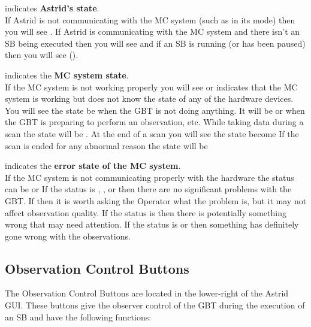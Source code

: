 \begin{description}[leftmargin=*,itemsep=0pt]
\item[Observation State] indicates \textbf{\gls{Astrid}'s state}.\\
If \gls{Astrid} is not communicating with the \gls{MC} system (such as in its
 mode) then you will see .  If \gls{Astrid} is
communicating with the \gls{MC} system and there isn't an \gls{SB} being executed
then you will see  and if an \gls{SB} is running (or has been paused)
then you will see (). 

\item[GBT State] indicates the \textbf{\gls{MC} system state}.\\
If the \gls{MC} system is not working properly you will see 
or   indicates that the \gls{MC} system is working
but does not know the state of any of the hardware devices.  You will see the state
be  when the \gls{GBT} is not doing anything.  It will be 
or  when the \gls{GBT} is preparing to perform an observation, etc.
While taking data during a scan the state will be .  At the end
of a scan you will see the state become   If the scan is ended
for any abnormal reason the state will be 

\item[GBT Status] indicates the \textbf{error state of the \gls{MC} system}.\\
If the \gls{MC} system is not communicating properly with the hardware the status can
be  or   If the status is , ,
or   then there are no significant problems with the \gls{GBT}.
If  then it is worth asking the Operator what the problem is, but
it may not affect observation quality.  If the status is  then there
is potentially something wrong that may need attention. If the status is
 or  then something has definitely gone wrong with the
observations.
\end{description}


\subsection{Observation Control Buttons}

The Observation Control Buttons are located in the lower-right of the \gls{Astrid}
\gls{GUI}. These buttons give the observer control of the \gls{GBT} during the
execution of an \gls{SB} and have the following functions:

